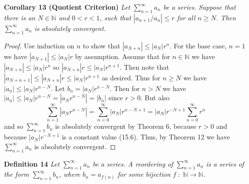 \documentclass{article}
\begin{document}
\begin{flushleft}
\textbf{Corollary 13 (Quotient Criterion)}
\textsl{Let $\sum_{n=1}^{\infty} a_n$ be a series. Suppose that there is an $N \in \mathbb{N}$ and $0<r<1$, such that $|a_{n+1}/a_n| \leq r$ for all $n \geq N$. Then $\sum_{n=1}^{\infty} a_n$ is absolutely convergent.}
\begin{proof}
Use induction on $n$ to show that $|a_{N+n}| \leq |a_N| r^n$. For the base case, $n=1$ we have $|a_{N+1}| \leq |a_N| r$ by assumption. Assume that for $n \in \mathbb{N}$ we have $|a_{N+n}| \leq |a_N| r^n$ so $|a_{N+n}| r \leq |a_N| r^{n+1}$. Then note that $|a_{N+n+1}| \leq |a_{N+n}| r \leq |a_N| r^{n+1}$ as desired. Thus for $n \geq N$ we have $|a_n| \leq |a_N| r^{n-N}$. Let $b_n = |a_N| r^{n-N}$. Then for $n>N$ we have $|a_n| \leq |a_N| r^{n-N} = |a_N r^{n-N}| = |b_n|$ since $r>0$. But also
\[
\sum_{n=1}^{\infty} |a_N r^{n-N} | = \sum_{n=0}^{\infty} |a_N| r^{n-N+1} = |a_N| r^{-N+1} \sum_{n=0}^{\infty} r^n
\]
and so $\sum_{n=1}^{\infty} b_n$ is absolutely convergent by Theorem 6, because $r>0$ and because $|a_N| r^{-N+1}$ is a constant value (15.6). Thus, by Theorem 12 we have $\sum_{n=1}^{\infty} a_n$ is absolutely convergent.
\end{proof}

\textbf{Definition 14}
\textsl{Let $\sum_{n=1}^{\infty} a_n$ be a series. A reordering of $\sum_{n=1}^{\infty} a_n$ is a series of the form $\sum_{n=1}^{\infty} b_n$, where $b_n=a_{f(n)}$ for some bijection $f \; : \; \mathbb{N} \rightarrow \mathbb{N}$.}\newline


\end{flushleft}
\end{document}
